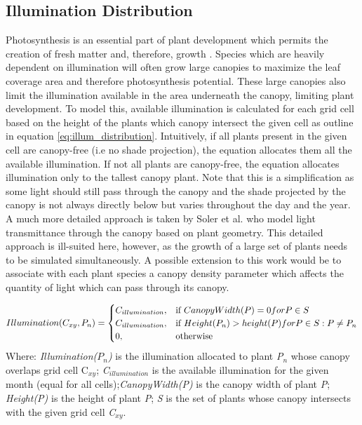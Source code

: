 \subsection{Illumination Distribution}

Photosynthesis is an essential part of plant development which permits the creation of fresh matter and, therefore, growth \cite{Soler2001}. Species which are heavily dependent on illumination will often grow large canopies to maximize the leaf coverage area and therefore photosynthesis potential. These large canopies also limit the illumination available in the area underneath the canopy, limiting plant development. To model this, available illumination is calculated for each grid cell based on the height of the plants which canopy intersect the given cell as outline in equation \ref{eq:illum_distribution}. Intuitively, if all plants present in the given cell are canopy-free (i.e no shade projection), the equation allocates them all the available illumination. If not all plants are canopy-free, the equation allocates illumination only to the tallest canopy plant. Note that this is a simplification as some light should still pass through the canopy and the shade projected by the canopy is not always directly below but varies throughout the day and the year. A much more detailed approach is taken by Soler et al. \cite{Soler2001} who model light transmittance through the canopy based on plant geometry. This detailed approach is ill-suited here, however, as the growth of a large set of plants needs to be simulated simultaneously. A possible extension to this work would be to associate with each plant species a canopy density parameter which affects the quantity of light which can pass through its canopy.

\begin{equation}
\centering
Illumination(C_{xy}, P_{n}) = 
\begin{cases}
	C_{illumination}, & \text{if } CanopyWidth(P) = 0 for P \in S \\
	C_{illumination}, & \text{if } Height(P_{n}) > height(P) for P \in S : P \neq P_{n} \\
    0,              & \text{otherwise}
\end{cases}
\label{eq:illum_distribution}
\end{equation}
Where: \textit{Illumination($P_{n}$)} is the illumination allocated to plant \textit{P$_{n}$} whose canopy overlaps grid cell C$_{xy}$; \textit{C$_{illumination}$} is the available illumination for the given month (equal for all cells);\textit{CanopyWidth(P)} is the canopy width of plant \textit{P}; \textit{Height(P)} is the height of plant \textit{P}; \textit{S} is the set of plants whose canopy intersects with the given grid cell \textit{C$_{xy}$}.\\

